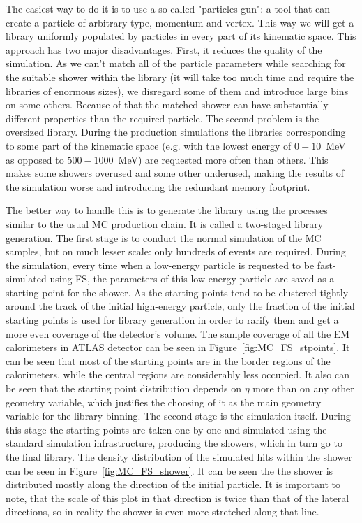 The easiest way to do it is to use a so-called "particles gun": a tool that can create a particle of arbitrary type, momentum and vertex. This way we will get a library uniformly populated by particles in every part of its kinematic space. This approach has two major disadvantages. First, it reduces the quality of the simulation. As we can't match all of the particle parameters while searching for the suitable shower within the library (it will take too much time and require the libraries of enormous sizes), we disregard some of them and introduce large bins on some others. Because of that the matched shower can have substantially different properties than the required particle. The second problem is the oversized library. During the production simulations the libraries corresponding to some part of the kinematic space (e.g. with the lowest energy of $0-10$~MeV as opposed to $500-1000$~MeV) are requested more often than others. This makes some showers overused and some other underused, making the results of the simulation worse and introducing the redundant memory footprint.

The better way to handle this is to generate the library using the processes similar to the usual MC production chain. It is called a two-staged library generation. The first stage is to conduct the normal simulation of the MC samples, but on much lesser scale: only hundreds of events are required. During the simulation, every time when a low-energy particle is requested to be fast-simulated using FS, the parameters of this low-energy particle are saved as a starting point for the shower. As the starting points tend to be clustered tightly around the track of the initial high-energy particle, only the fraction of the initial starting points is used for library generation in order to rarify them and get a more even coverage of the detector's volume. The sample coverage of all the EM calorimeters in ATLAS detector can be seen in Figure~\ref{fig:MC_FS_stpoints}. It can be seen that most of the starting points are in the border regions of the calorimeters, while the central regions are considerably less occupied. It also can be seen that the starting point distribution depends on $\eta$ more than on any other geometry variable, which justifies the choosing of it as the main geometry variable for the library binning. The second stage is the simulation itself. During this stage the starting points are taken one-by-one and simulated using the standard simulation infrastructure, producing the showers, which in turn go to the final library. The density distribution of the simulated hits within the shower can be seen in Figure~\ref{fig:MC_FS_shower}. It can be seen the the shower is distributed mostly along the direction of the initial particle. It is important to note, that the scale of this plot in that direction is twice than that of the lateral directions, so in reality the shower is even more stretched along that line.


